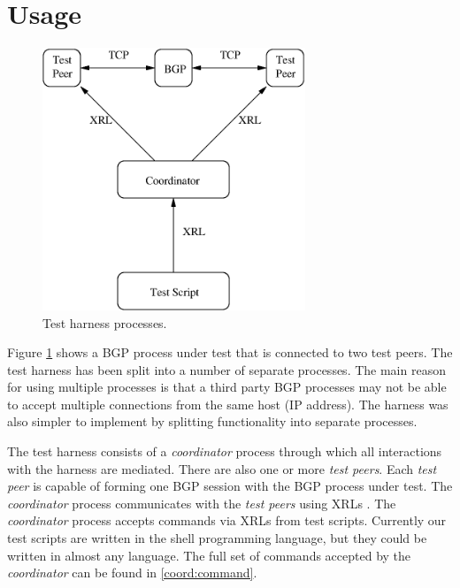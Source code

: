 \documentclass[11pt]{article}
\newcommand{\coordinator}{{\em coordinator}\xspace}
\newcommand{\testpeer}{{\em test peer}\xspace}
\newcommand{\testpeers}{{\em test peers}\xspace}
\begin{document}
\section{Usage}

\begin{figure}
\centerline{\includegraphics[width=0.70\textwidth]{figs/harness}}
\caption{\label{fig:harness}Test harness processes.}
\end{figure}

Figure \ref{fig:harness} shows a BGP process under test that is
connected to two test peers. The test harness has been split into a
number of separate processes. The main reason for using multiple
processes is that a third party BGP processes may not be able to
accept multiple connections from the same host (IP address). The
harness was also simpler to implement by splitting functionality into
separate processes.

The test harness consists of a \coordinator process through which
all interactions with the harness are mediated. There are also one or
more \testpeers . Each \testpeer is capable of forming one BGP
session with the BGP process under test. The \coordinator process
communicates with the \testpeers using XRLs \cite{xorp:xrl}. The
\coordinator process accepts commands via XRLs from test
scripts. Currently our test scripts are written in the shell
programming language, but they could be written in almost any
language. The full set of commands accepted by the \coordinator can be
found in \ref{coord:command}.
\end{document}
